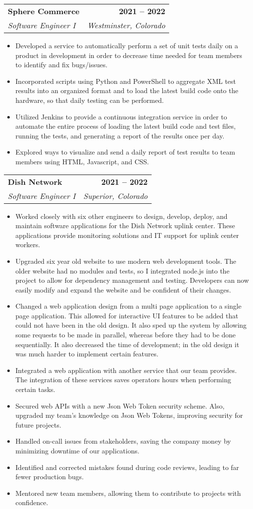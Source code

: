 \documentclass[letterpaper,11pt]{article}
\makeatletter
\newcommand{\resumeItem}[1]{
  \item\small{
    {#1 \vspace{-2pt}}
  }
}
\newcommand{\resumeSubheading}[4]{
  \vspace{-2pt}\item
    \begin{tabular*}{1.0\textwidth}[t]{l@{\extracolsep{\fill}}r}
      \textbf{#1} & \textbf{\small #2} \\
      \textit{\small#3} & \textit{\small #4} \\
    \end{tabular*}\vspace{-7pt}
}
\newcommand{\resumeItemListStart}{\begin{itemize}}
\newcommand{\resumeItemListEnd}{\end{itemize}\vspace{-5pt}}
\makeatother
\begin{document}
    \resumeSubheading
      {Sphere Commerce}{2021 -- 2022}
      {Software Engineer I}{Westminster, Colorado}
      \resumeItemListStart
        \resumeItem{Developed a service to automatically perform a set of unit tests daily on a product in development in order to decrease time needed for team members to identify and fix bugs/issues.}
        \resumeItem{Incorporated scripts using Python and PowerShell to aggregate XML test results into an organized format and to load the latest build code onto the hardware, so that daily testing can be performed.}
        \resumeItem{Utilized Jenkins to provide a continuous integration service in order to automate the entire process of loading the latest build code and test files, running the tests, and generating a report of the results once per day.}
        \resumeItem{Explored ways to visualize and send a daily report of test results to team members  using HTML, Javascript, and CSS.}
      \resumeItemListEnd

    \resumeSubheading
      {Dish Network}{2021 -- 2022}
      {Software Engineer I}{Superior, Colorado}
      \resumeItemListStart
        \resumeItem{Worked closely with six other engineers to design, develop, deploy, and maintain software applications for the Dish Network uplink center. These applications provide monitoring solutions and IT support for uplink center workers.}
        \resumeItem{Upgraded six year old website to use modern web development tools. The older website had no modules and tests, so I integrated node.js into the project to allow for dependency management and testing. Developers can now easily modify and expand the website and be confident of their changes. }
        \resumeItem{Changed a web application design from a multi page application to a single page application. This allowed for interactive UI features to be added that could not have been in the old design. It also sped up the system by allowing some requests to be made in parallel, whereas before they had to be done sequentially. It also decreased the time of development; in the old design it was much harder to implement certain features. }
        \resumeItem{Integrated a web application with another service that our team provides. The integration of these services saves operators hours when performing certain tasks.}
        \resumeItem{Secured web APIs with a new Json Web Token security scheme. Also, upgraded my team's knowledge on Json Web Tokens, improving security for future projects.}
        \resumeItem{Handled on-call issues from stakeholders, saving the company money by minimizing downtime of our applications. }
        \resumeItem{Identified and corrected mistakes found during code reviews, leading to far fewer production bugs. }
        \resumeItem{Mentored new team members, allowing them to contribute to projects with confidence.}
    \resumeItemListEnd
\end{document}
